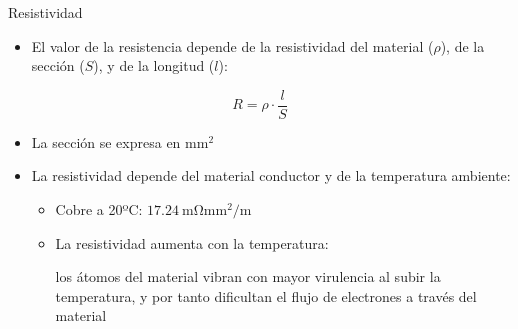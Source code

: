\documentclass[aspectratio=169, xcolor={usenames,svgnames,dvipsnames}]{beamer}
\begin{document}

\begin{frame}{Resistividad}
    \begin{itemize}
        \item El valor de la resistencia depende de la \alert{resistividad del material} (\(\rho\)), de la \alert{sección} (\(S\)), y de la
        longitud (\(l\)):
    \end{itemize}
    \begin{equation*}
      R = \rho \cdot \frac{l}{S}
    \end{equation*}
    
    \begin{itemize}
        \item La \alert{sección} se expresa en \(\si{\milli\meter\squared}\)
        
        \vspace{4mm}
        \item La \alert{resistividad} depende del material conductor y de la temperatura ambiente:
        \vspace{2mm}
        \begin{itemize}
            \item \normalsize{Cobre a 20ºC: \(\qty{17.24}{\milli\ohm\milli\meter\squared\per\meter}\)}
            \vspace{2mm}
            \item La resistividad \alert{aumenta con la temperatura}: 
            
            los átomos del material vibran con mayor virulencia al subir la temperatura, y por tanto dificultan el flujo de electrones a través del material 
        \end{itemize}
    \end{itemize}
\end{frame}

\end{document}
